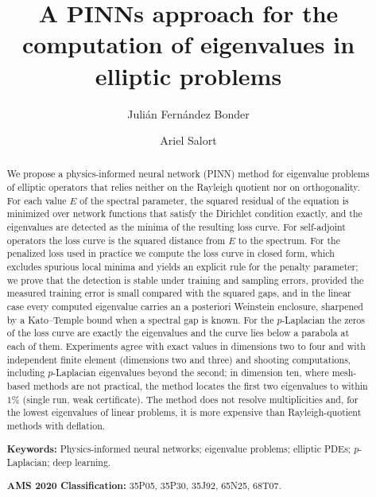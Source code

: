 \documentclass[10pt]{amsart}
\newenvironment{revblock}{\color{blue}}{}
\theoremstyle{definition}
\theoremstyle{remark}
\theoremstyle{plain}
\begin{document}
\title{A PINNs approach for the computation of eigenvalues in elliptic problems}

\author{Juli\'an Fern\'andez Bonder}
\address{Departamento de Matem\'atica, Facultad de Ciencias Exactas y Naturales, Universidad de Buenos Aires, Buenos Aires, Argentina, and Instituto de C\'alculo UBA-CONICET, Buenos Aires, Argentina}

\author{Ariel Salort}
\address{Departamento de Matem\'aticas Aplicadas y Ciencia de Datos, Universidad San Pablo-CEU, CEU Universities, Juli\'an Romea 2, 28003 Madrid, Spain}


\begin{abstract}
\begin{revblock}
We propose a physics-informed neural network (PINN) method for eigenvalue problems of elliptic
operators that relies neither on the Rayleigh quotient nor on orthogonality. For each value $E$ of the
spectral parameter, the squared residual of the equation is minimized over network functions that
satisfy the Dirichlet condition exactly, and the eigenvalues are detected as the minima of the
resulting loss curve. For self-adjoint operators the loss curve is the squared distance from $E$ to
the spectrum. For the penalized loss used in practice we compute the loss curve in closed form, which
excludes spurious local minima and yields an explicit rule for the penalty parameter; we prove that
the detection is stable under training and sampling errors, provided the measured training error is
small compared with the squared gaps, and in the linear case every computed eigenvalue carries an
a posteriori Weinstein enclosure, sharpened by a Kato--Temple bound when a spectral gap is known. For the $p$-Laplacian the zeros of the loss curve
are exactly the eigenvalues and the curve lies below a parabola at each of them. Experiments
agree with exact values in dimensions two to four and with independent finite element (dimensions
two and three) and shooting computations, including $p$-Laplacian eigenvalues beyond the second; in dimension ten, where
mesh-based methods are not practical, the method locates the first two eigenvalues to within $1\%$
(single run, weak certificate). The method does not resolve
multiplicities and, for the lowest eigenvalues of linear problems, it is more expensive than
Rayleigh-quotient methods with deflation.

\medskip\noindent\textbf{Keywords:} Physics-informed neural networks; eigenvalue problems; elliptic
PDEs; $p$-Laplacian; deep learning.

\noindent\textbf{AMS 2020 Classification:} 35P05, 35P30, 35J92, 65N25, 68T07.
\end{revblock}
\end{abstract}
\end{document}
